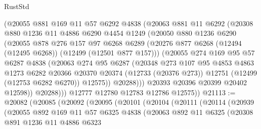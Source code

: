 \begin{lexlean}{RustStd}
\begin{coremodule}
            (@20055
              @881
              @169
              @11
              @57
              @6292
              @4838
              (@20063
                @881
                @11
                @6292
                (@20308
                  @880
                  @1236
                  @11
                  @4886
                  @6290
                  @4454
                  @1249
                  (@20050
                    @880
                    @1236
                    @6290
                    (@20055
                      @878
                      @276
                      @157
                      @97
                      @6268
                      @6289
                      (@20276 @877 @6268 (@12494 (@12495 @6268)) (@12499 (@12501 @877 @157)))
                      (@20055
                        @274
                        @169
                        @95
                        @57
                        @6287
                        @4838
                        (@20063
                          @274
                          @95
                          @6287
                          (@20348
                            @273
                            @107
                            @95
                            @4853
                            @4863
                            @1273
                            @6282
                            @20366
                            @20370
                            @20374
                            (@12733 (@20376 @273))
                            @12751
                            (@12499 (@12753 @6282 @6270))
                            @12575))
                        @20288)))
                  @20393
                  @20396
                  @20399
                  @20402
                  @12598))
              @20288)))
        @12777
        @12780
        @12783
        @12786
        @12575))
@21113 := @20082
    (@20085
      (@20092
        (@20095
          (@20101
            (@20104
              (@20111
                (@20114
                  (@20939
                    (@20055
                      @892
                      @169
                      @11
                      @57
                      @6325
                      @4838
                      (@20063
                        @892
                        @11
                        @6325
                        (@20308
                          @891
                          @1236
                          @11
                          @4886
                          @6323

\end{coremodule}
\end{lexlean}
